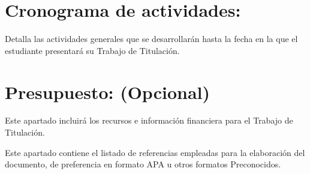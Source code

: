 \documentclass{article}
\begin{document}
\section{Cronograma de actividades:}
Detalla las actividades generales que se desarrollarán hasta la fecha en la que el estudiante presentará su Trabajo de Titulación. 

\section{Presupuesto: (Opcional)}

Este apartado incluirá los recursos e información financiera para el Trabajo de Titulación. 






\vspace{1cm}
Este apartado contiene el listado de referencias empleadas para la elaboración del documento, de preferencia en formato APA u otros formatos Preconocidos.
\end{document}
